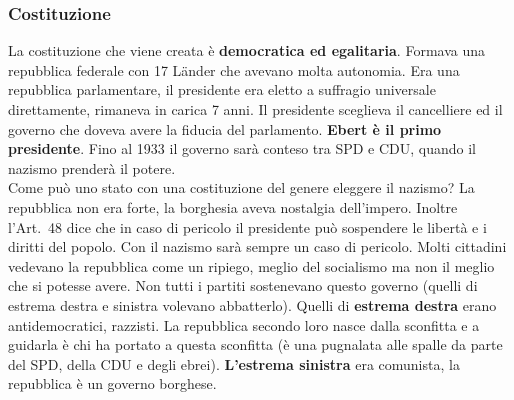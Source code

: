 \subsubsection{Costituzione}
La costituzione che viene creata è \textbf{democratica ed egalitaria}. Formava una repubblica 
federale con 17 Länder che avevano molta autonomia. Era una repubblica parlamentare, il presidente 
era eletto a suffragio universale direttamente, rimaneva in carica 7 anni. Il presidente sceglieva
il cancelliere ed il governo che doveva avere la fiducia del parlamento. \textbf{Ebert è il primo
presidente}. Fino al 1933 il governo sarà conteso tra SPD e CDU, quando il nazismo prenderà il 
potere.\\
Come può uno stato con una costituzione del genere eleggere il nazismo? La repubblica non era forte,
la borghesia aveva nostalgia dell'impero. Inoltre l'Art.\ 48 dice che in caso di pericolo il 
presidente può sospendere le libertà e i diritti del popolo. Con il nazismo sarà sempre un caso di
pericolo. Molti cittadini vedevano la repubblica come un ripiego, meglio del socialismo ma non il
meglio che si potesse avere. Non tutti i partiti sostenevano questo governo (quelli di estrema destra
e sinistra volevano abbatterlo). Quelli di \textbf{estrema destra} erano antidemocratici, razzisti. 
La repubblica secondo loro nasce dalla sconfitta e a guidarla è chi ha portato a questa sconfitta
(è una pugnalata alle spalle da parte del SPD, della CDU e degli ebrei). \textbf{L'estrema sinistra}
era comunista, la repubblica è un governo borghese.


